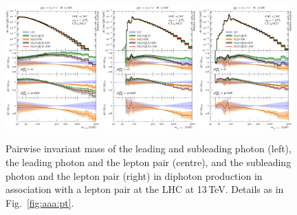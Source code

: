 \begin{figure}[t!]
  \centering
  \includegraphics[width=0.32\textwidth]{figs_aaz/m_y1y2_comb_log}
  \includegraphics[width=0.32\textwidth]{figs_aaz/m_y1l1l2_comb_log}
  \includegraphics[width=0.32\textwidth]{figs_aaz/m_y2l1l2_comb_log}
  \caption{
    Pairwise invariant mass of the leading and subleading photon (left),
    the leading photon and the lepton pair (centre), and the subleading 
    photon and the lepton pair (right)
    in diphoton production in association with a lepton pair 
    at the LHC at 13\,TeV. 
    Details as in Fig.\ \ref{fig:aaa:pt}.
    \label{fig:aaz:myy}
  }
\end{figure}

